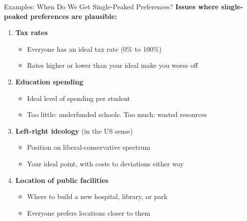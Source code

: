 \documentclass[10pt]{beamer}
\begin{document}
\begin{frame}{Examples: When Do We Get Single-Peaked Preferences?}
\textbf{Issues where single-peaked preferences are plausible:}

\begin{enumerate}
\item \textbf{Tax rates}
\begin{itemize}
\item Everyone has an ideal tax rate (0\% to 100\%)
\item Rates higher or lower than your ideal make you worse off
\end{itemize}


\item \textbf{Education spending}
\begin{itemize}
\item Ideal level of spending per student
\item Too little: underfunded schools. Too much: wasted resources
\end{itemize}


\item \textbf{Left-right ideology} (in the US sense)
\begin{itemize}
\item Position on liberal-conservative spectrum
\item Your ideal point, with costs to deviations either way
\end{itemize}


\item \textbf{Location of public facilities}
\begin{itemize}
\item Where to build a new hospital, library, or park
\item Everyone prefers locations closer to them
\end{itemize}
\end{enumerate}
\end{frame}
\end{document}
